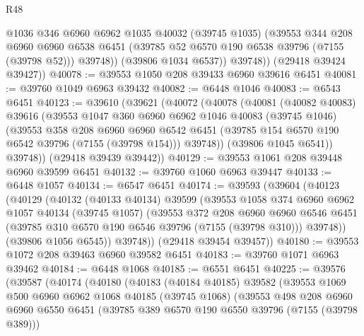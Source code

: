 \begin{lexlean}{R48}
\begin{coremodule}
              @1036
              @346
              @6960
              @6962
              @1035
              @40032
              (@39745 @1035)
              (@39553
                @344
                @208
                @6960
                @6960
                @6538
                @6451
                (@39785 @52 @6570 @190 @6538 @39796 (@7155 (@39798 @52)))
                @39748))
            (@39806 @1034 @6537))
          @39748))
      (@29418 @39424 @39427))
@40078 := @39553 @1050 @208 @39433 @6960 @39616 @6451
@40081 := @39760 @1049 @6963 @39432
@40082 := @6448 @1046
@40083 := @6543 @6451
@40123 := @39610
    (@39621
      (@40072
        (@40078
          (@40081
            (@40082 @40083)
            @39616
            (@39553
              @1047
              @360
              @6960
              @6962
              @1046
              @40083
              (@39745 @1046)
              (@39553
                @358
                @208
                @6960
                @6960
                @6542
                @6451
                (@39785 @154 @6570 @190 @6542 @39796 (@7155 (@39798 @154)))
                @39748))
            (@39806 @1045 @6541))
          @39748))
      (@29418 @39439 @39442))
@40129 := @39553 @1061 @208 @39448 @6960 @39599 @6451
@40132 := @39760 @1060 @6963 @39447
@40133 := @6448 @1057
@40134 := @6547 @6451
@40174 := @39593
    (@39604
      (@40123
        (@40129
          (@40132
            (@40133 @40134)
            @39599
            (@39553
              @1058
              @374
              @6960
              @6962
              @1057
              @40134
              (@39745 @1057)
              (@39553
                @372
                @208
                @6960
                @6960
                @6546
                @6451
                (@39785 @310 @6570 @190 @6546 @39796 (@7155 (@39798 @310)))
                @39748))
            (@39806 @1056 @6545))
          @39748))
      (@29418 @39454 @39457))
@40180 := @39553 @1072 @208 @39463 @6960 @39582 @6451
@40183 := @39760 @1071 @6963 @39462
@40184 := @6448 @1068
@40185 := @6551 @6451
@40225 := @39576
    (@39587
      (@40174
        (@40180
          (@40183
            (@40184 @40185)
            @39582
            (@39553
              @1069
              @500
              @6960
              @6962
              @1068
              @40185
              (@39745 @1068)
              (@39553
                @498
                @208
                @6960
                @6960
                @6550
                @6451
                (@39785 @389 @6570 @190 @6550 @39796 (@7155 (@39798 @389)))

\end{coremodule}
\end{lexlean}
